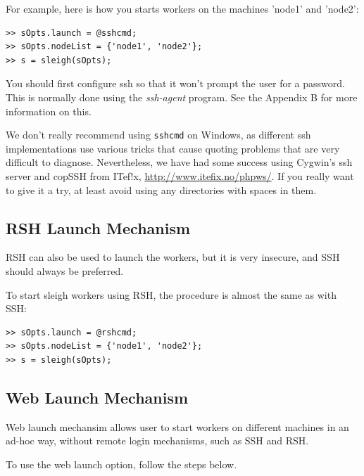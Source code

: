 For example, here is how you starts workers on the machines 'node1' and
'node2':

\begin{samepage}
\begin{verbatim}
>> sOpts.launch = @sshcmd;
>> sOpts.nodeList = {'node1', 'node2'};
>> s = sleigh(sOpts);
\end{verbatim}
\end{samepage}

You should first configure ssh so that it won't prompt the user for a
password.  This is normally done using the \textit{ssh-agent} program.
See the Appendix B for more information on this.

We don't really recommend using \texttt{sshcmd} on Windows, as
different ssh implementations use various tricks that cause quoting
problems that are very difficult to diagnose.  Nevertheless, we have had
some success using Cygwin's ssh server and copSSH from ITef!x,
\url{http://www.itefix.no/phpws/}.  If you really want to give it a try,
at least avoid using any directories with spaces in them.

\subsection{RSH Launch Mechanism}
RSH can also be used to launch the workers, but it is very insecure, and
SSH should always be preferred.

To start sleigh workers using RSH, the procedure is almost the
same as with SSH:

\begin{samepage}
\begin{verbatim}
>> sOpts.launch = @rshcmd;
>> sOpts.nodeList = {'node1', 'node2'};
>> s = sleigh(sOpts);
\end{verbatim}
\end{samepage}

\subsection{Web Launch Mechanism}
Web launch mechansim allows user to start workers on different
machines in an ad-hoc way, without remote login mechanisms,
such as SSH and RSH. 

To use the web launch option, follow the steps below.


